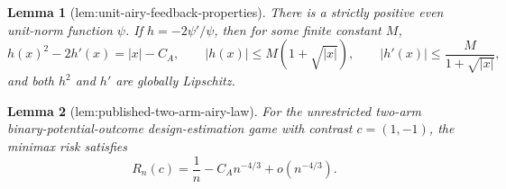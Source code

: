 \documentclass{article}
\newtheorem{lemma}{Lemma}
\begin{document}
\begin{lemma}[lem:unit-airy-feedback-properties]\label{lem:unit-airy-feedback-properties}
There is a strictly positive even unit-norm function \(\psi\).  If \(h=-2\psi'/\psi\), then for some finite constant \(M\),
\[
h(x)^2-2h'(x)=|x|-C_A,\qquad
|h(x)|\le M(1+\sqrt{|x|}),\qquad
|h'(x)|\le \frac{M}{1+\sqrt{|x|}},
\]
and both \(h^2\) and \(h'\) are globally Lipschitz.
\end{lemma}

\begin{lemma}[lem:published-two-arm-airy-law]\label{lem:published-two-arm-airy-law}
For the unrestricted two-arm binary-potential-outcome design-estimation game with contrast \(c=(1,-1)\), the minimax risk satisfies
\[
R_n(c)=\frac1n-C_An^{-4/3}+o(n^{-4/3}).
\]
\end{lemma}
\end{document}
